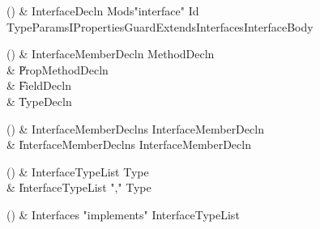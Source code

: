 \begin{bbgrammarappendix}

() & InterfaceDecln \label{prod:InterfaceDecln}  \: Mods\opt \xcd"interface" Id TypeParamsI\opt Properties\opt Guard\opt ExtendsInterfaces\opt InterfaceBody  \\


\end{bbgrammarappendix}

\begin{bbgrammarappendix}

() & InterfaceMemberDecln \label{prod:InterfaceMemberDecln}  \: MethodDecln  \\

 &    \| PropMethodDecln \\
 &    \| FieldDecln \\
 &    \| TypeDecln \\

\end{bbgrammarappendix}

\begin{bbgrammarappendix}

() & InterfaceMemberDeclns \label{prod:InterfaceMemberDeclns}  \: InterfaceMemberDecln  \\

 &    \| InterfaceMemberDeclns InterfaceMemberDecln \\

\end{bbgrammarappendix}

\begin{bbgrammarappendix}

() & InterfaceTypeList \label{prod:InterfaceTypeList}  \: Type  \\

 &    \| InterfaceTypeList \xcd"," Type \\

\end{bbgrammarappendix}

\begin{bbgrammarappendix}

() & Interfaces \label{prod:Interfaces}  \: \xcd"implements" InterfaceTypeList  \\


\end{bbgrammarappendix}

